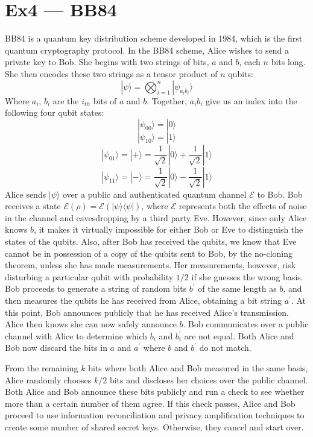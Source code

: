 \documentclass[12pt, a4paper]{article}
\begin{document}
\section*{Ex4 --- BB84}
BB84 is a quantum key distribution scheme developed in 1984, which is the first quantum cryptography protocol.\newline
In the BB84 scheme,  Alice wishes to send a private key to Bob. She begins with two strings of bits, $a$ and $b$, each $n$ bits long. 
She then encodes these two strings as a tensor product of $n$ qubits:
$$|\psi \rangle = \bigotimes_{i=1}^n |\psi_{a_ib_i} \rangle$$
Where $a_i$, $b_i$ are the $i_{th}$ bits of $a$ and $b$. Together, $a_ib_i$ give us an index into the following four qubit states:
$$|\psi_{00} \rangle = |0\rangle$$
$$|\psi_{10} \rangle = |1\rangle$$
$$|\psi_{01} \rangle = |+\rangle = \frac{1}{\sqrt{2}}|0\rangle + \frac{1}{\sqrt{2}}|1\rangle$$
$$|\psi_{11} \rangle = |-\rangle = \frac{1}{\sqrt{2}}|0\rangle - \frac{1}{\sqrt{2}}|1\rangle$$
Alice sends $|\psi \rangle$  over a public and authenticated quantum channel $\mathcal{E}$ to Bob. 
Bob receives a state $\mathcal{E}(\rho) = \mathcal{E}(|\psi \rangle \langle \psi |)$, 
where ${\mathcal {E}}$ represents both the effects of noise in the channel and eavesdropping by a third party Eve. 
However, since only Alice knows $b$, it makes it virtually impossible for either Bob or Eve to distinguish the states of the qubits. 
Also, after Bob has received the qubits, we know that Eve cannot be in possession of a copy of the qubits sent to Bob, 
by the no-cloning theorem, unless she has made measurements. Her measurements, however, 
risk disturbing a particular qubit with probability $1/2$ if she guesses the wrong basis.\newline
Bob proceeds to generate a string of random bits $b^\prime$ of the same length as $b$, 
and then measures the qubits he has received from Alice, obtaining a bit string $a^\prime$. At this point, 
Bob announces publicly that he has received Alice's transmission. Alice then knows she can now safely announce $b$. 
Bob communicates over a public channel with Alice to determine which $b_i$ and $b^\prime_i$ are not equal. 
Both Alice and Bob now discard the bits in $a$ and $a^\prime$ where $b$ and $b^\prime$ do not match.

From the remaining $k$ bits where both Alice and Bob measured in the same basis, 
Alice randomly chooses $k/2$ bits and discloses her choices over the public channel. 
Both Alice and Bob announce these bits publicly and run a check to see whether more than a certain number of them agree. 
If this check passes, 
Alice and Bob proceed to use information reconciliation and privacy amplification techniques to create some number of shared secret keys. 
Otherwise, they cancel and start over.
\end{document}
